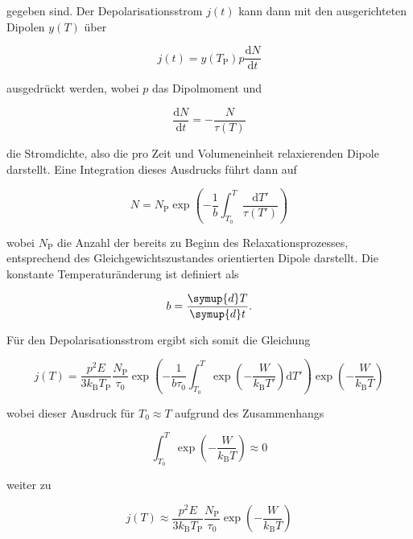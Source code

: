 gegeben sind. Der Depolarisationsstrom $j(t)$ kann dann mit den ausgerichteten 
Dipolen $y(T)$ über 

\begin{equation*}
    j(t) = y(T_{\mathrm{P}}) p \frac{\mathrm{d}N}{\mathrm{d}t}
\end{equation*}

ausgedrückt werden, wobei $p$ das Dipolmoment und 

\begin{equation*}
    \frac{\mathrm{d}N}{\mathrm{d}t} = -\frac{N}{\tau(T)}
\end{equation*}

die Stromdichte, also die pro Zeit und Volumeneinheit relaxierenden Dipole darstellt.
Eine Integration dieses Ausdrucks führt dann auf 

\begin{equation*}
    N = N_{\mathrm{P}} \exp{ \left( - \frac{ 1 }{ b } \int_{T_0}^T \frac{ \mathrm{d}T' }{ \tau(T') } \right )}
\end{equation*}

wobei $N_{\text{P}}$ die Anzahl der bereits zu Beginn des Relaxationsprozesses,
entsprechend des Gleichgewichtszustandes orientierten Dipole darstellt.
Die konstante Temperaturänderung ist definiert als

\begin{equation*}
    b = \frac{\symup{d}T}{\symup{d}t}.
\end{equation*}

Für den Depolarisationsstrom ergibt sich somit die Gleichung 

\begin{equation}
    j(T) = \frac{ p^{2} E }{ 3 k_{\mathrm{B}} T_{\mathrm{P}} } \frac{ N_{\mathrm{P}} }{ \tau_{\text{0}} } \exp{ \left( - \frac{ 1 }{ b \tau_{\text{0}} } \int_{T_{\text{0}}}^T \exp{ \left( - \frac{ W }{ k_{\mathrm{B}} T' } \right) \mathrm{d}T' } \right) } \exp{ \left( -\frac{ W }{ k_{\mathrm{B}} T } \right) } 
    \label{eq:j_T}
\end{equation}

wobei dieser Ausdruck für $T_{\text{0}} \approx T$ aufgrund des 
Zusammenhangs

\begin{equation*}
    \int_{T_{\text{0}}}^T \exp{ \left( - \frac{ W }{ k_{\mathrm{B}} T } \right )} \approx 0  
\end{equation*}

weiter zu 

\begin{equation}
    j(T) \approx \frac{ p^{2} E }{ 3 k_{\mathrm{B}} T_{\mathrm{P} }} \frac{ N_{\mathrm{P}} }{ \tau_{\text{0}} } \exp{ \left( - \frac{ W }{ k_{\mathrm{B}} T} \right ) }
    \label{eq2}
\end{equation}

